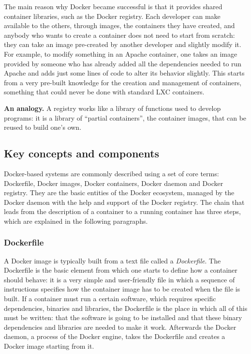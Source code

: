 The main reason why Docker became successful is that it provides shared container libraries, such as the Docker registry. Each developer can make available to the others, through images, the containers they have created, and anybody who wants to create a container does not need to start from scratch: they can take an image pre-created by another developer and slightly modify it. For example, to modify something in an Apache container, one takes an image provided by someone who has already added all the dependencies needed to run Apache and adds just some lines of code to alter its behavior slightly. This starts from a very pre-built knowledge for the creation and management of containers, something that could never be done with standard LXC containers.

\begin{notebox}
	\textbf{An analogy.} A registry works like a library of functions used to develop programs: it is a library of ``partial containers'', the container images, that can be reused to build one's own.
\end{notebox}

\subsection{Key concepts and components}

Docker-based systems are commonly described using a set of core terms: Dockerfile, Docker images, Docker containers, Docker daemon and Docker registry. They are the basic entities of the Docker ecosystem, managed by the Docker daemon with the help and support of the Docker registry. The chain that leads from the description of a container to a running container has three steps, which are explained in the following paragraphs.

\begin{center}
\end{center}

\subsubsection*{Dockerfile}

A Docker image is typically built from a text file called a \emph{Dockerfile}. The Dockerfile is the basic element from which one starts to define how a container should behave: it is a very simple and user-friendly file in which a sequence of instructions specifies how the container image has to be created when the file is built. If a container must run a certain software, which requires specific dependencies, binaries and libraries, the Dockerfile is the place in which all of this must be written: that the software is going to be installed and that these binary dependencies and libraries are needed to make it work. Afterwards the Docker daemon, a process of the Docker engine, takes the Dockerfile and creates a Docker image starting from it.

